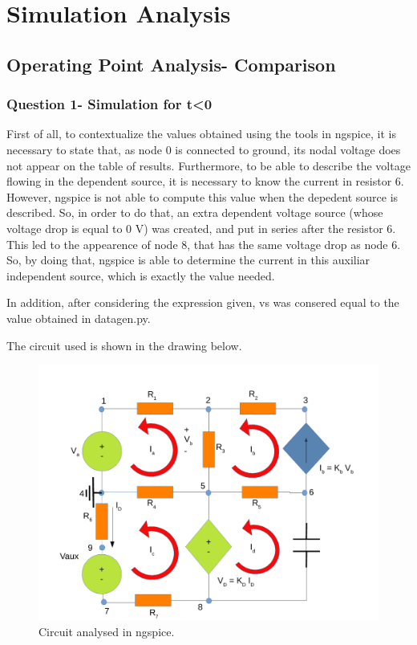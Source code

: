 
\section{Simulation Analysis}
\label{simulation}

\subsection{Operating Point Analysis- Comparison}
\subsubsection{Question 1- Simulation for t<0}
\par First of all, to contextualize the values obtained using the tools in ngspice, it is necessary to state that, as node 0 is connected to ground, its nodal voltage does not appear on the table of results. Furthermore, to be able to describe the voltage flowing in the dependent source, it is necessary to know the current in resistor 6. However, ngspice is not able to compute this value when the depedent source is described. So, in order to do that, an extra dependent voltage source (whose voltage drop is equal to 0 V) was created, and put in series after the resistor 6. This led to the appearence of node 8, that has the same voltage drop as node 6. So, by doing that, ngspice is able to determine the current in this auxiliar independent source, which is exactly the value needed.
\par In addition, after considering the expression given, vs was consered equal to the value obtained in datagen.py.


\par The circuit used is shown in the drawing below.

\begin{figure}[ht] \centering
\includegraphics[width=1.0\linewidth]{sim1draw.pdf}
\caption{Circuit analysed in ngspice.}
\label{simdraw}
\end{figure}


